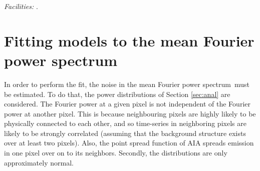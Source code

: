 \documentclass{aastex}
\newcommand{\PS}{power spectrum}
\newcommand{\mFps}{mean Fourier \PS}
\begin{document}


{\it Facilities:} .



\appendix

\section{Fitting models to the \mFps}\label{sec:app:ind}
In order to perform the fit, the noise in the \mFps\ must be
estimated.  To do that, the power distributions of Section
\ref{sec:anal} are considered.  The Fourier power at a given pixel is
not independent of the Fourier power at another pixel.  This is
because neighbouring pixels are highly likely to be physically
connected to each other, and so time-series in neighboring pixels are
likely to be strongly correlated (assuming that the background
structure exists over at least two pixels).  Also, the point spread
function of AIA spreads emission in one pixel over on to its
neighbors.  Secondly, the distributions are only approximately normal.
\end{document}
